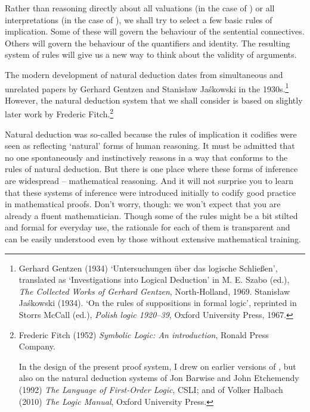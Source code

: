 
Rather than reasoning directly about all valuations (in the case of \TFL) or all interpretations (in the case of \FOL), we shall try to select a few basic rules of implication. Some of these will govern the behaviour of the sentential connectives. Others will govern the behaviour of the quantifiers and identity. The resulting system of rules will give us a new way to think about the validity of arguments. 

The modern development of natural deduction dates from simultaneous and unrelated papers by Gerhard Gentzen and Stanisław Jaśkowski in the 1930s.\footnote{Gerhard Gentzen (1934) `Untersuchungen über das logische Schließen', translated as `Investigations into Logical Deduction' in M. E. Szabo (ed.), \emph{The Collected Works of Gerhard Gentzen}, North-Holland, 1969. Stanisław Jaśkowski (1934). `On the rules of suppositions in formal logic', reprinted in Storrs McCall (ed.), \emph{Polish logic 1920–39}, Oxford University Press, 1967.} However, the natural deduction system that we shall consider is based on slightly later work by Frederic Fitch.\footnote{Frederic Fitch (1952) \emph{Symbolic Logic: An introduction}, Ronald Press Company. 

In the design of the present proof system, I drew on earlier versions of \forallx, but also on the natural deduction systems of Jon Barwise and John Etchemendy (1992) \emph{The Language of First-Order Logic}, CSLI; and of Volker Halbach (2010) \emph{The Logic Manual}, Oxford University Press.} 

Natural deduction was so-called because the rules of implication it codifies were seen as reflecting `natural' forms of human reasoning. It must be admitted that no one spontaneously and instinctively reasons in a way that conforms to the rules of natural deduction. But there is one place where these forms of inference are widespread – mathematical reasoning. And it will not surprise you to learn that these systems of inference were introduced initially to codify good practice in mathematical proofs. Don't worry, though: we won't expect that you are already a fluent mathematician. Though some of the rules might be a bit stilted and formal for everyday use, the rationale for each of them is transparent and can be easily understood even by those without extensive mathematical training.


